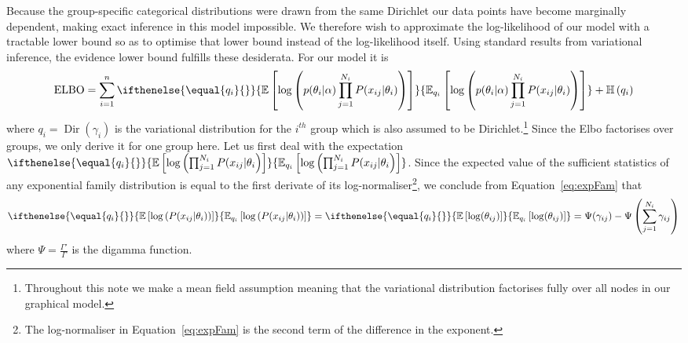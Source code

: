 \documentclass[a4paper, 11pt]{article}
\DeclareMathOperator{\ELBO}{ELBO}
\DeclareMathOperator{\Dir}{Dir}
\newcommand{\E}[2][]{
\ifthenelse{\equal{#1}{}}{\mathbb{E}\left[ #2 \right]}{\mathbb{E}_{#1}\left[ #2 \right]}
}
\newcommand{\Ent}[1]{\mathbb{H}\left( #1 \right)}
\begin{document}
Because the group-specific categorical distributions were drawn from the same Dirichlet our data points have become marginally dependent, making exact inference in this
model impossible. We therefore wish to approximate the log-likelihood of our model with a tractable lower bound so as to optimise that lower bound instead of the
log-likelihood itself. Using standard results from variational inference, the evidence lower bound fulfills these desiderata. For our model it is
\begin{equation}
\ELBO = \sum_{i=1}^{n} \E[q_{i}]{\log\left( p(\theta_{i}|\alpha)\prod_{j=1}^{N_{i}}P(x_{ij}|\theta_{i}) \right)} + \Ent{q_{i}}
\end{equation}
where $ q_{i} = \Dir(\gamma_{i}) $ is the variational distribution for the $ i^{th} $ group which is also assumed to be Dirichlet.\footnote{Throughout this note
we make a mean field assumption meaning that the variational distribution factorises fully over all nodes in our graphical model.} Since the Elbo factorises over 
groups, we only derive it for one group here. Let us first deal with the expectation $ \E[q_{i}]{\log\left( \prod_{j=1}^{N_{i}}P(x_{ij}|\theta_{i} \right)} $. 
Since the expected value of the sufficient statistics of any exponential family distribution is equal to the first derivate of its log-normaliser\footnote{The log-normaliser in Equation~\eqref{eq:expFam} is the second term of the difference in the exponent.}, we conclude
from Equation~\eqref{eq:expFam} that 
\begin{equation}
\E[q_{i}]{\log\left( P(x_{ij}|\theta_{i}) \right)} = \E[q_{i}]{\log(\theta_{ij})} = \Psi(\gamma_{ij}) - \Psi\left(\sum_{j=1}^{N_{i}}\gamma_{ij}\right) 
\end{equation}
where $ \Psi = \frac{\Gamma'}{\Gamma} $ is the digamma function.
\end{document}
